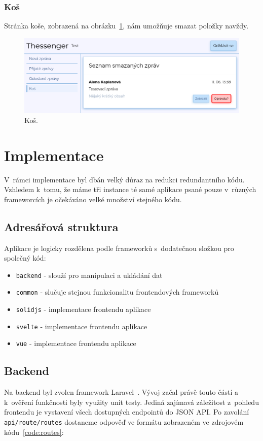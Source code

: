 \documentclass[
  master,
  program=ainf,
  printversion,
  tables=false,
  sourcecodes,
  glossaries,
  index
]{kidiplom}
\begin{document}
\subsubsection{Koš}
Stránka koše, zobrazená na obrázku~\ref{fig:bin}, nám umožňuje smazat položky navždy.

\begin{figure}[H]
  \centering
  \includegraphics[width=\textwidth]{graphics/thessenger_bin.png}
  \caption{Koš.}
  \label{fig:bin}
\end{figure}

\newpage
\section{Implementace}
V~rámci implementace byl dbán velký důraz na redukci redundantního kódu.
Vzhledem k~tomu, že máme tři instance té samé aplikace psané pouze v~různých
frameworcích je očekáváno velké množství stejného kódu.

\subsection{Adresářová struktura}
Aplikace je logicky rozdělena podle frameworků s~dodatečnou složkou pro společný kód:
\begin{itemize}
  \item {\tt backend} - slouží pro manipulaci a ukládání dat
  \item {\tt common} - slučuje stejnou funkcionalitu frontendových frameworků
  \item {\tt solidjs} - implementace frontendu aplikace
  \item {\tt svelte} - implementace frontendu aplikace
  \item {\tt vue} - implementace frontendu aplikace
\end{itemize}

\subsection{Backend}
Na backend byl zvolen framework Laravel~\cite{laravel}. Vývoj začal právě touto částí a
k~ověření funkčnosti byly využity unit testy. Jediná zajímavá záležitost
z~pohledu frontendu je vystavení všech dostupných endpointů do JSON API. Po
zavolání {\tt api/route/routes} dostaneme odpověď ve formátu zobrazeném ve zdrojovém kódu~\ref{code:routes}:
\end{document}
